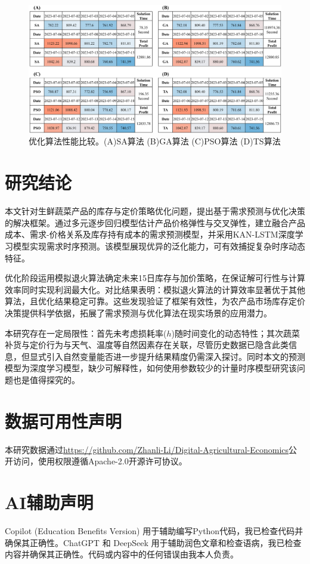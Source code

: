 \documentclass[lang=cn,12pt,a4paper]{elegantpaper}
\begin{document}
\begin{figure}[H]
    \centering
    \includegraphics[width=1\textwidth]{图片9.png}
    \caption{优化算法性能比较。(A)SA算法 (B)GA算法 (C)PSO算法 (D)TS算法}
    \label{fig:fig9}
\end{figure}
\section{研究结论}
\label{sec:conclusions}

本文针对生鲜蔬菜产品的库存与定价策略优化问题，提出基于需求预测与优化决策的解决框架。通过多元逐步回归模型估计产品价格弹性与交叉弹性，建立融合产品成本、需求-价格关系及库存持有成本的需求预测模型，并采用KAN-LSTM深度学习模型实现需求时序预测。该模型展现优异的泛化能力，可有效捕捉复杂时序动态特征。

优化阶段运用模拟退火算法确定未来15日库存与加价策略，在保证解可行性与计算效率同时实现利润最大化。对比结果表明：模拟退火算法的计算效率显著优于其他算法，且优化结果稳定可靠。这些发现验证了框架有效性，为农产品市场库存定价决策提供科学依据，拓展了需求预测与优化算法在现实场景的应用潜力。

本研究存在一定局限性：首先未考虑损耗率($h$)随时间变化的动态特性；其次蔬菜补货与定价行为与天气、温度等自然因素存在关联，尽管历史数据已隐含此类信息，但显式引入自然变量能否进一步提升结果精度仍需深入探讨。同时本文的预测模型为深度学习模型，缺少可解释性，如何使用参数较少的计量时序模型研究该问题也是值得探究的。
\newpage
\section*{数据可用性声明}
本研究数据通过\url{https://github.com/Zhanli-Li/Digital-Agricultural-Economics}公开访问，使用权限遵循Apache-2.0开源许可协议。
\section*{AI辅助声明}
Copilot (Education Benefits Version) 用于辅助编写Python代码，我已检查代码并确保其正确性。ChatGPT 和 DeepSeek 用于辅助润色文章和检查语病，我已检查内容并确保其正确性。代码或内容中的任何错误由我本人负责。
\newpage
\nocite{*}
\printbibliography[heading=bibintoc, title=\ebibname]
\newpage
\appendix
\addappheadtotoc
\end{document}
